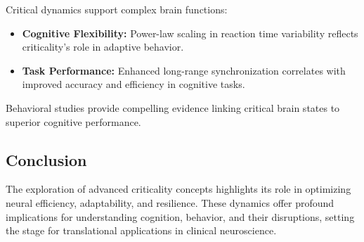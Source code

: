 Critical dynamics support complex brain functions:
\begin{itemize}
    \item \textbf{Cognitive Flexibility:} Power-law scaling in reaction time variability reflects criticality’s role in adaptive behavior.
    \item \textbf{Task Performance:} Enhanced long-range synchronization correlates with improved accuracy and efficiency in cognitive tasks.
\end{itemize}

Behavioral studies provide compelling evidence linking critical brain states to superior cognitive performance.

\subsection*{Conclusion}

The exploration of advanced criticality concepts highlights its role in optimizing neural efficiency, adaptability, and resilience. These dynamics offer profound implications for understanding cognition, behavior, and their disruptions, setting the stage for translational applications in clinical neuroscience.
